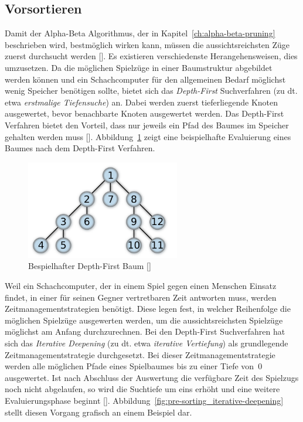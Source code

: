 \subsection{Vorsortieren}

Damit der Alpha-Beta Algorithmus, der in Kapitel~\ref{ch:alpha-beta-pruning} beschrieben wird, bestmöglich wirken kann, müssen die aussichtsreichsten Züge zuerst durchsucht werden [\cite{Wiki2019}].
Es existieren verschiedenste Herangehensweisen, dies umzusetzen.
Da die möglichen Spielzüge in einer Baumstruktur abgebildet werden können und ein Schachcomputer für den allgemeinen Bedarf möglichst wenig Speicher benötigen sollte, bietet sich das \textit{Depth-First} Suchverfahren (zu dt. etwa \textit{erstmalige Tiefensuche}) an.
Dabei werden zuerst tieferliegende Knoten ausgewertet, bevor benachbarte Knoten ausgewertet werden.
Das Depth-First Verfahren bietet den Vorteil, dass nur jeweils ein Pfad des Baumes im Speicher gehalten werden muss [\cite{Wiki2019b}].
Abbildung~\ref{fig:pre-sorting_depth-first-tree} zeigt eine beispielhafte Evaluierung eines Baumes nach dem Depth-First Verfahren.

\begin{figure}[H]
    \centering
    \includegraphics[width=0.6\textwidth]{images/theory/pre-sorting_depth-first-tree.png}
    \caption[Bespielhafter Depth-First Baum]{Bespielhafter Depth-First Baum [\cite{Wiki2019b}]}
    \label{fig:pre-sorting_depth-first-tree}
\end{figure}

\noindent Weil ein Schachcomputer, der in einem Spiel gegen einen Menschen Einsatz findet, in einer für seinen Gegner vertretbaren Zeit antworten muss, werden Zeitmanagementstrategien benötigt.
Diese legen fest, in welcher Reihenfolge die möglichen Spielzüge ausgewerten werden, um die aussichtsreichsten Spielzüge möglichst am Anfang durchzurechnen.
Bei den Depth-First Suchverfahren hat sich das \textit{Iterative Deepening} (zu dt. etwa \textit{iterative Vertiefung}) als grundlegende Zeitmanagementstrategie durchgesetzt.
Bei dieser Zeitmanagementstrategie werden alle möglichen Pfade eines Spielbaumes bis zu einer Tiefe von~0 ausgewertet.
Ist nach Abschluss der Auswertung die verfügbare Zeit des Spielzugs noch nicht abgelaufen, so wird die Suchtiefe um eins erhöht und eine weitere Evaluierungsphase beginnt [\cite{Wiki2019a}].
Abbildung~\ref{fig:pre-sorting_iterative-deepening} stellt diesen Vorgang grafisch an einem Beispiel dar.

